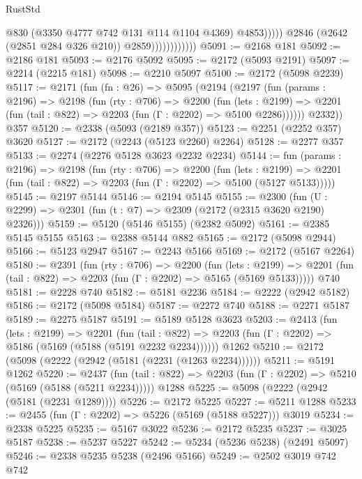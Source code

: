 \begin{lexlean}{RustStd}
\begin{coremodule}
                                      @830
                                      (@3350 @4777 @742 @131 @114 @1104 @4369)
                                      @4853)))))
                            @2846
                            (@2642 (@2851 @284 @326 @210))
                            @2859))))))))))))
@5091 := @2168 @181
@5092 := @2186 @181
@5093 := @2176 @5092
@5095 := @2172 (@5093 @2191)
@5097 := @2214 (@2215 @181)
@5098 := @2210 @5097
@5100 := @2172 (@5098 @2239)
@5117 := @2171
    (fun (fn : @26) =>
    @5095
      (@2194
        (@2197
          (fun (params : @2196) =>
          @2198
            (fun (rty : @706) =>
            @2200
              (fun (lets : @2199) =>
              @2201 (fun (tail : @822) => @2203 (fun (Γ : @2202) => @5100 @2286))))))
        @2332))
    @357
@5120 := @2338 (@5093 (@2189 @357))
@5123 := @2251 (@2252 @357) @3620
@5127 := @2172 (@2243 (@5123 @2260) @2264)
@5128 := @2277 @357
@5133 := @2274 (@2276 @5128 @3623 @2232 @2234)
@5144 := fun (params : @2196) =>
  @2198
    (fun (rty : @706) =>
    @2200
      (fun (lets : @2199) =>
      @2201 (fun (tail : @822) => @2203 (fun (Γ : @2202) => @5100 (@5127 @5133)))))
@5145 := @2197 @5144
@5146 := @2194 @5145
@5155 := @2300 (fun (U : @2299) => @2301 (fun (t : @7) => @2309 (@2172 (@2315 @3620 @2190) @2326)))
@5159 := @5120 (@5146 @5155) (@2382 @5092)
@5161 := @2385 @5145 @5155
@5163 := @2388 @5144 @882
@5165 := @2172 (@5098 @2944)
@5166 := @5123 @2947
@5167 := @2243 @5166
@5169 := @2172 (@5167 @2264)
@5180 := @2391
    (fun (rty : @706) =>
    @2200
      (fun (lets : @2199) =>
      @2201 (fun (tail : @822) => @2203 (fun (Γ : @2202) => @5165 (@5169 @5133)))))
    @740
@5181 := @2228 @740
@5182 := @5181 @2236
@5184 := @2222 (@2942 @5182)
@5186 := @2172 (@5098 @5184)
@5187 := @2272 @740
@5188 := @2271 @5187
@5189 := @2275 @5187
@5191 := @5189 @5128 @3623
@5203 := @2413
    (fun (lets : @2199) =>
    @2201
      (fun (tail : @822) => @2203 (fun (Γ : @2202) => @5186 (@5169 (@5188 (@5191 @2232 @2234))))))
    @1262
@5210 := @2172 (@5098 (@2222 (@2942 (@5181 (@2231 (@1263 @2234))))))
@5211 := @5191 @1262
@5220 := @2437
    (fun (tail : @822) => @2203 (fun (Γ : @2202) => @5210 (@5169 (@5188 (@5211 @2234)))))
    @1288
@5225 := @5098 (@2222 (@2942 (@5181 (@2231 @1289))))
@5226 := @2172 @5225
@5227 := @5211 @1288
@5233 := @2455 (fun (Γ : @2202) => @5226 (@5169 (@5188 @5227))) @3019
@5234 := @2338 @5225
@5235 := @5167 @3022
@5236 := @2172 @5235
@5237 := @3025 @5187
@5238 := @5237 @5227
@5242 := @5234 (@5236 @5238) (@2491 @5097)
@5246 := @2338 @5235 @5238 (@2496 @5166)
@5249 := @2502 @3019 @742 @742

\end{coremodule}
\end{lexlean}
